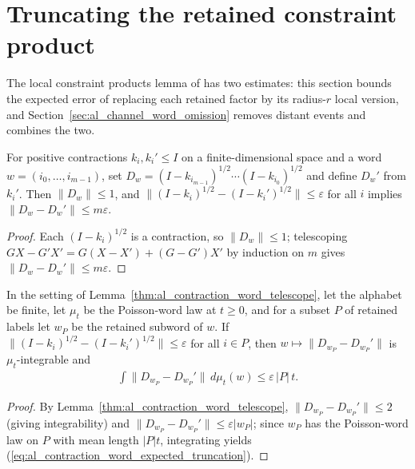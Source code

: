 
\section{Truncating the retained constraint product}

The local constraint products lemma of \cite[Section~10]{OpenAI2026AreaLaw}
has two estimates: this section bounds the expected error of replacing
each retained factor by its radius-$r$ local version, and
Section~\ref{sec:al_channel_word_omission} removes distant events and
combines the two.

\begin{lemma}
    \label{thm:al_contraction_word_telescope}
    \leanok
    For positive contractions $k_i,k_i'\le I$ on a finite-dimensional
    space and a word $w=(i_0,\ldots,i_{m-1})$, set
    $D_w=(I-k_{i_{m-1}})^{1/2}\cdots(I-k_{i_0})^{1/2}$ and define
    $D_w'$ from $k_i'$. Then $\|D_w\|\le1$, and
    $\|(I-k_i)^{1/2}-(I-k_i')^{1/2}\|\le\varepsilon$ for all $i$ implies
    $\|D_w-D_w'\|\le m\varepsilon$.
\end{lemma}
\begin{proof}\leanok
    Each $(I-k_i)^{1/2}$ is a contraction, so $\|D_w\|\le1$; telescoping
    $GX-G'X'=G(X-X')+(G-G')X'$ by induction on $m$ gives
    $\|D_w-D_w'\|\le m\varepsilon$.
\end{proof}

\begin{lemma}
    \label{thm:al_contraction_word_expected_truncation}
    \leanok
    In the setting of Lemma~\ref{thm:al_contraction_word_telescope},
    let the alphabet be finite, let $\mu_t$ be the Poisson-word law at
    $t\ge0$, and for a subset $P$ of retained labels let $w_P$ be the
    retained subword of $w$. If
    $\|(I-k_i)^{1/2}-(I-k_i')^{1/2}\|\le\varepsilon$ for all $i\in P$,
    then $w\mapsto\|D_{w_P}-D_{w_P}'\|$ is $\mu_t$-integrable and
    \begin{align}
        \int\|D_{w_P}-D_{w_P}'\|\,d\mu_t(w)\le\varepsilon\,|P|\,t.
        \label{eq:al_contraction_word_expected_truncation}
    \end{align}
\end{lemma}
\begin{proof}\leanok
    By Lemma~\ref{thm:al_contraction_word_telescope},
    $\|D_{w_P}-D_{w_P}'\|\le2$ (giving integrability) and
    $\|D_{w_P}-D_{w_P}'\|\le\varepsilon|w_P|$; since $w_P$ has the
    Poisson-word law on $P$ with mean length $|P|t$, integrating yields
    (\ref{eq:al_contraction_word_expected_truncation}).
\end{proof}

